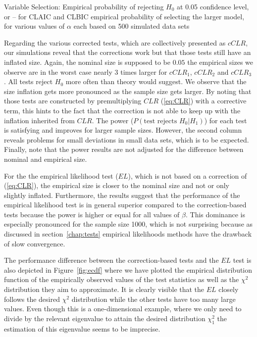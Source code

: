 \documentclass[12pt, a4paper]{article}
\numberwithin{defcounter}{section}
\numberwithin{excounter}{section}
\begin{document}
\begin{table}[H]
\centering
\caption{Variable Selection: Empirical probability of rejecting $H_0$ at 0.05 confidence level, or -- for \ac{CLAIC} and \ac{CLBIC} empirical probability of selecting the larger model,  for various values of $\alpha$ each based on 500 simulated data sets}

\label{tab:lin}
\end{table}



Regarding the various corrected tests, which are collectively presented as $cCLR$, our simulations reveal that the corrections work but that those tests still have an inflated size. Again, the nominal size is supposed to be $0.05$ the empirical sizes we observe are in the worst case nearly 3 times larger for $cCLR_1$, $cCLR_2$ and $cCLR_3$. All tests reject $H_0$ more often than theory would suggest.  We  observe that the size inflation gets more pronounced as the sample size gets larger. By noting that those tests are constructed by premultiplying $CLR$ (\ref{eq:CLR}) with a corrective term, this hints to the fact that the correction is not able to keep up with the inflation inherited from $CLR$. The power ($P(\text{test rejects } H_0| H_1)$) for each test is satisfying and improves for larger sample sizes. However, the second column reveals problems for small deviations in small data sets, which is to be expected. Finally, note that the power results are not adjusted for the difference between nominal and empirical size. 

For the the empirical likelihood test ($EL$), which is not based on a correction of (\ref{eq:CLR}), the empirical size is closer to the nominal size and not or only slightly inflated. Furthermore, the results suggest that the performance of the empirical likelihood test is in general superior compared to the correction-based tests because the power is higher or equal for all values of $\beta$. This dominance is especially pronounced for the sample size 1000, which is not surprising because as discussed in section~\ref{chap:tests} empirical likelihoods methods have the drawback of slow convergence.

The performance difference between the correction-based tests and the $EL$ test is also depicted in Figure~\ref{fig:ecdf} where we have plotted the empirical distribution function of the empirically observed values of the test statistics as well as the $\chi^2$ distribution they aim to approximate. It is clearly visible that the $EL$ closely follows the desired $\chi^2$ distribution while the other tests have too many large values. Even though  this is a one-dimensional example, where we only need to divide by the relevant eigenvalue to attain the desired distribution $\chi_1^2$ the estimation of this eigenvalue seems to be imprecise. 
\end{document}
